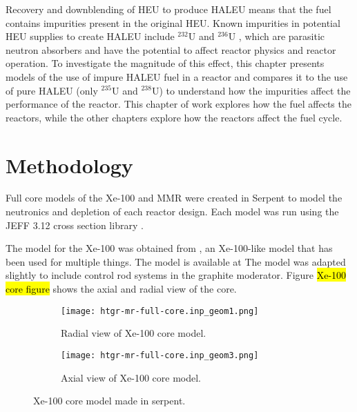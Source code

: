Recovery and downblending of \gls{HEU} to produce \gls{HALEU} means that 
the fuel contains impurities present in the original
\gls{HEU}. Known impurities in potential \gls{HEU}
supplies to create \gls{HALEU} include $^{232}$U and $^{236}$U
\cite{vaden_isotopic_2018,nelson_foreign_2010},  
which are parasitic neutron absorbers and have the potential to affect 
reactor physics and reactor operation. To investigate the magnitude of this 
effect, this chapter presents models of the use of 
impure \gls{HALEU} fuel in a reactor and compares it to the use of pure 
\gls{HALEU} (only $^{235}$U and $^{238}$U)
to understand how the impurities affect the performance of the reactor.
This chapter of work explores how the fuel affects the reactors, while 
the other chapters explore how the reactors affect the fuel cycle. 

\section{Methodology}
Full core models of the Xe-100 and \gls{MMR} were created in Serpent 
\cite{leppanen_serpent_2014} to model the neutronics and depletion of 
each reactor design. Each model was run using the JEFF 3.12 cross section 
library \cite{koning_status_2011}.

The model for the Xe-100 was obtained from 
\cite{richter_phlox_2021}, an Xe-100-like model that has been used for 
multiple things. The model is available at \cite{richter_zoerichterphlox_2022}
The model was adapted slightly to include control rod systems in the 
graphite moderator. Figure \hl{Xe-100 core figure} shows the axial and 
radial view of the core.

\begin{figure}
    \centering 
    \begin{subfigure}{0.45\textwidth}
        \centering 
        \texttt{[image: htgr-mr-full-core.inp\_geom1.png]}
        \caption{Radial view of Xe-100 core model.}
        \label{fig:xe100_core_radial}        
    \end{subfigure}
    \hfill
    \begin{subfigure}{0.45\textwidth}
        \centering 
        \texttt{[image: htgr-mr-full-core.inp\_geom3.png]}
        \caption{Axial view of Xe-100 core model.}
        \label{fig:xe100_core_axial}        
    \end{subfigure}
    \caption{Xe-100 core model made in serpent.}
    \label{fig:xe100_core}
\end{figure}


